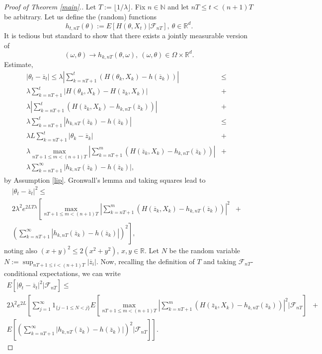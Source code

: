 \documentclass[a4paper,draft]{article}
\begin{document}
\begin{proof}[Proof of Theorem \ref{main}.] Let $T:=\lfloor 1/\lambda\rfloor$.
Fix $n\in\mathbb{N}$ and let $nT\leq t<(n+1)T$ be arbitrary.
Let us define the (random) functions 
$$
h_{t,nT}(\theta):=
E[H(\theta,X_t)\vert\mathcal{F}_{nT}],\ \theta\in\mathbb{R}^d.
$$ 
It is tedious but standard to show that there exists a jointly measurable version of
$$
(\omega,\theta)\to h_{k,nT}(\theta,\omega),\ 
(\omega,\theta)\in\Omega\times \mathbb{R}^d.
$$ 
Estimate, 
\begin{eqnarray*}
| \theta_{t}-\overline{z}_{t}| \leq \lambda \left\vert\sum_{k=nT+1}^t 
\left(H(\theta_k,X_k)-h(\overline{z}_k)\right)\right\vert &\leq&\\
\lambda \sum_{k=nT+1}^t \vert 
H(\theta_k,X_k)-H(\overline{z}_k,X_k)\vert
&+&\\
\lambda \left\vert\sum_{k=nT+1}^{t} 
\left(H(\overline{z}_k,X_k)-h_{k,nT}(\overline{z}_k)\right) \right\vert &+&\\
\lambda \sum_{k=nT+1}^t 
\left\vert h_{k,nT}(\overline{z}_k)- h(\overline{z}_k)\right\vert &\leq&\\
\lambda L \sum_{k=nT+1}^t |\theta_k-\overline{z}_k| &+&\\
\lambda
\max_{nT+1\leq m< (n+1)T} \left|\sum_{k=nT+1}^m \left(H(\overline{z}_k,X_k)-
h_{k,nT}(\overline{z}_k)\right)\right| &+&\\
\lambda \sum_{k=nT+1}^{\infty} \vert h_{k,nT}(\overline{z}_k)- h(\overline{z}_k)\vert, & &
\end{eqnarray*}
by Assumption \ref{lip}.
Gronwall's lemma and taking squares lead to
\begin{eqnarray*}
|\theta_{t}-\overline{z}_{t}|^2 \leq & & \\ 
2\lambda^2 e^{2LT\lambda} 
\left[\max_{nT+1\leq m< (n+1)T} \left|\sum_{k=nT+1}^m \left(H(\overline{z}_k,X_k)-
h_{k,nT}(\overline{z}_k)\right)\right|^2 \right.
&+& \\ 
\left. \left(\sum_{k=nT+1}^{\infty} \left\vert h_{k,nT}(\overline{z}_k)- h(\overline{z}_k)\right\vert\right)^2\right], & &
\end{eqnarray*}
noting also $(x+y)^2\leq 2(x^2+y^2)$, $x,y\in\mathbb{R}$.
Let $N$ be the random variable 
$N:=\sup_{nT+1\leq i< (n+1)T}|\overline{z}_i|$. 
Now, recalling the definition of $T$ and taking $\mathcal{F}_{nT}$-conditional expectations, we can write
\begin{eqnarray*}
E\left[|\theta_{t}-\overline{z}_{t}|^2\vert\mathcal{F}_{nT}\right]
\leq & & \\
2\lambda^2 e^{2L}\left[\sum_{j=1}^{\infty}1_{\{j-1\leq N <j\}}
E\left[\max_{nT+1\leq m<(n+1)T} \left|\sum_{k=nT+1}^m \left(H(\overline{z}_k,X_k)-
h_{k,nT}(\overline{z}_k)\right)\right|^2 \vert\mathcal{F}_{nT}\right]\right. 
&+& \\
\left. E\left[\left(\sum_{k=nT+1}^{\infty} \vert h_{k,nT}(\overline{z}_k)- 
h(\overline{z}_k)\vert\right)^2\vert\mathcal{F}_{nT}\right]
\right]. & &
\end{eqnarray*}



\end{proof}
\end{document}
